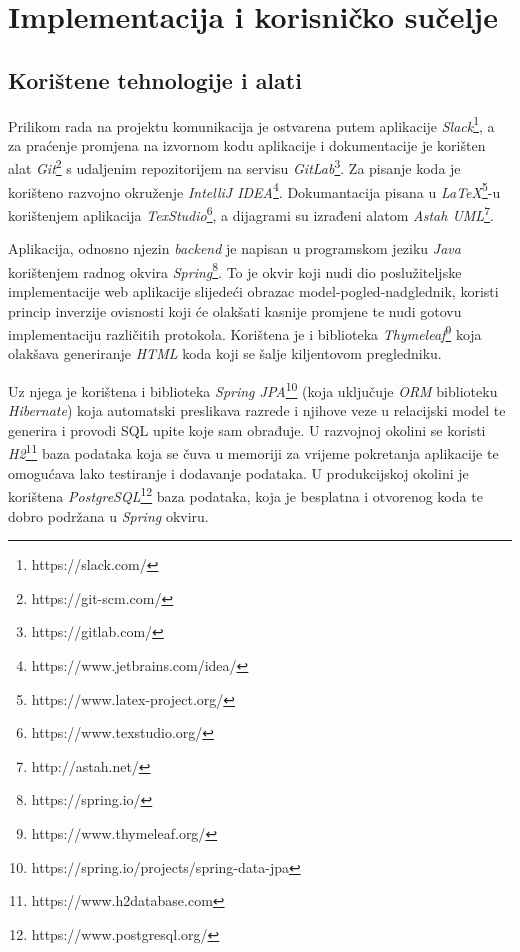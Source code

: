 \chapter{Implementacija i korisničko sučelje}
		
		\section{Korištene tehnologije i alati}
%		
%			

		
		Prilikom rada na projektu komunikacija je ostvarena putem aplikacije \textit{Slack}\footnote{https://slack.com/}, a za praćenje promjena na izvornom kodu aplikacije i dokumentacije je korišten alat \textit{Git}\footnote{https://git-scm.com/} s udaljenim repozitorijem na servisu \textit{GitLab}\footnote{https://gitlab.com/}. Za pisanje koda je korišteno razvojno okruženje \textit{IntelliJ IDEA}\footnote{https://www.jetbrains.com/idea/}. Dokumantacija pisana u \textit{LaTeX}\footnote{https://www.latex-project.org/}-u korištenjem aplikacija \textit{TexStudio}\footnote{https://www.texstudio.org/}, a dijagrami su izrađeni alatom \textit{Astah UML}\footnote{http://astah.net/}.
		
		Aplikacija, odnosno njezin \textit{backend} je napisan u programskom jeziku \textit{Java} korištenjem radnog okvira \textit{Spring}\footnote{https://spring.io/}. To je okvir koji nudi dio poslužiteljske implementacije web aplikacije slijedeći obrazac model-pogled-nadglednik, koristi princip inverzije ovisnosti koji će olakšati kasnije promjene te nudi gotovu implementaciju različitih protokola. Korištena je i biblioteka \textit{Thymeleaf}\footnote{https://www.thymeleaf.org/} koja olakšava generiranje \textit{HTML} koda koji se šalje kiljentovom pregledniku.
		
		Uz njega je korištena i biblioteka \textit{Spring JPA}\footnote{https://spring.io/projects/spring-data-jpa} (koja uključuje \textit{ORM} biblioteku \textit{Hibernate}) koja automatski preslikava razrede i njihove veze u relacijski model te generira i provodi SQL upite koje sam obrađuje. U razvojnoj okolini se koristi \textit{H2}\footnote{https://www.h2database.com} baza podataka koja se čuva u memoriji za vrijeme pokretanja aplikacije te omogućava lako testiranje i dodavanje podataka. U produkcijskoj okolini je korištena \textit{PostgreSQL}\footnote{https://www.postgresql.org/} baza podataka, koja je besplatna i otvorenog koda te dobro podržana u \textit{Spring} okviru.
		
